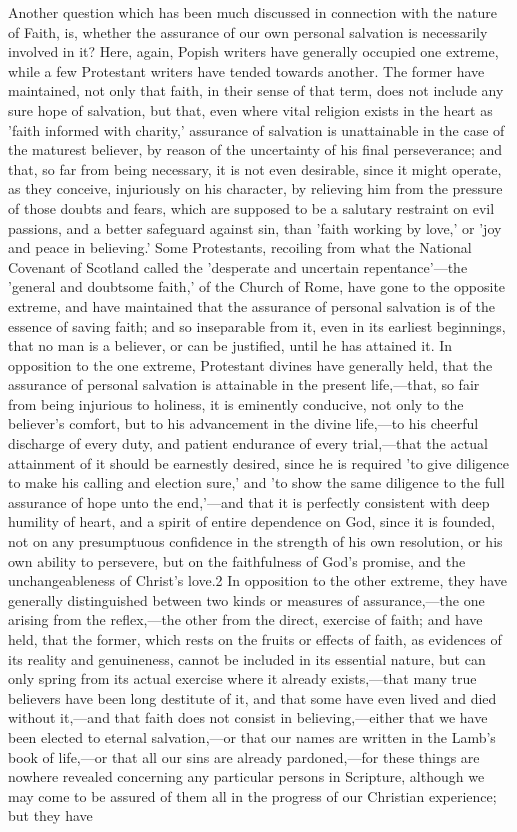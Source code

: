 \documentclass[
]{book}
\begin{document}
Another question which has been much discussed in connection with the nature of Faith, is, whether the assurance of our own personal salvation is necessarily involved in it? Here, again, Popish writers have generally occupied one extreme, while a few Protestant writers have tended towards another. The former have maintained, not only that faith, in their sense of that term, does not include any sure hope of salvation, but that, even where vital religion exists in the heart as 'faith informed with charity,' assurance of salvation is unattainable in the case of the maturest believer, by reason of the uncertainty of his final perseverance; and that, so far from being necessary, it is not even desirable, since it might operate, as they conceive, injuriously on his character, by relieving him from the pressure of those doubts and fears, which are supposed to be a salutary restraint on evil passions, and a better safeguard against sin, than 'faith working by love,' or 'joy and peace in believing.' Some Protestants, recoiling from what the National Covenant of Scotland called the 'desperate and uncertain repentance'---the 'general and doubtsome faith,' of the Church of Rome, have gone to the opposite extreme, and have maintained that the assurance of personal salvation is of the essence of saving faith; and so inseparable from it, even in its earliest beginnings, that no man is a believer, or can be justified, until he has attained it. In opposition to the one extreme, Protestant divines have generally held, that the assurance of personal salvation is attainable in the present life,---that, so fair from being injurious to holiness, it is eminently conducive, not only to the believer's comfort, but to his advancement in the divine life,---to his cheerful discharge of every duty, and patient endurance of every trial,---that the actual attainment of it should be earnestly desired, since he is required 'to give diligence to make his calling and election sure,' and 'to show the same diligence to the full assurance of hope unto the end,'---and that it is perfectly consistent with deep humility of heart, and a spirit of entire dependence on God, since it is founded, not on any presumptuous confidence in the strength of his own resolution, or his own ability to persevere, but on the faithfulness of God's promise, and the unchangeableness of Christ's love.2 In opposition to the other extreme, they have generally distinguished between two kinds or measures of assurance,---the one arising from the reflex,---the other from the direct, exercise of faith; and have held, that the former, which rests on the fruits or effects of faith, as evidences of its reality and genuineness, cannot be included in its essential nature, but can only spring from its actual exercise where it already exists,---that many true believers have been long destitute of it, and that some have even lived and died without it,---and that faith does not consist in believing,---either that we have been elected to eternal salvation,---or that our names are written in the Lamb's book of life,---or that all our sins are already pardoned,---for these things are nowhere revealed concerning any particular persons in Scripture, although we may come to be assured of them all in the progress of our Christian experience; but they have 
\end{document}

